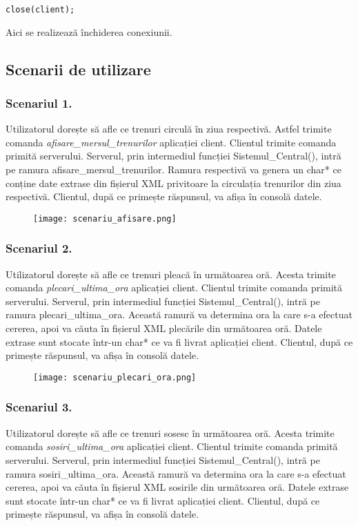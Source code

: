 \documentclass[runningheads]{llncs}
\begin{document}
\begin{verbatim}
close(client);
\end{verbatim}
Aici se realizează închiderea conexiunii.

\subsection{Scenarii de utilizare}

 \subsubsection{Scenariul 1.} 
 Utilizatorul dorește să afle ce trenuri circulă în ziua respectivă. Astfel trimite comanda \textit{afisare\_mersul\_trenurilor} aplicației client. Clientul trimite comanda primită serverului. Serverul, prin intermediul funcției Sistemul\_Central(), intră pe ramura afisare\_mersul\_trenurilor. Ramura respectivă va genera un char* ce conține date extrase din fișierul XML privitoare la circulația trenurilor din ziua respectivă. Clientul, după ce primește răspunsul, va afișa în consolă datele.
 \begin{figure}[H]
    \centering
    \texttt{[image: scenariu\_afisare.png]}
\end{figure}

 \subsubsection{Scenariul 2.} 
 Utilizatorul dorește să afle ce trenuri pleacă în următoarea oră. Acesta trimite comanda \textit{plecari\_ultima\_ora} aplicației client. Clientul trimite comanda primită serverului. Serverul, prin intermediul funcției Sistemul\_Central(), intră pe ramura plecari\_ultima\_ora.  Această ramură va determina ora la care s-a efectuat cererea, apoi va căuta în fișierul XML plecările din următoarea oră. Datele extrase sunt stocate într-un char* ce va fi livrat aplicației client. Clientul, după ce primește răspunsul, va afișa în consolă datele.

\begin{figure} [H]
    \centering
    \texttt{[image: scenariu\_plecari\_ora.png]}
\end{figure}
 \subsubsection{Scenariul 3.}
  Utilizatorul dorește să afle ce trenuri sosesc în următoarea oră. Acesta trimite comanda \textit{sosiri\_ultima\_ora} aplicației client. Clientul trimite comanda primită serverului. Serverul, prin intermediul funcției Sistemul\_Central(), intră pe ramura sosiri\_ultima\_ora.  Această ramură va determina ora la care s-a efectuat cererea, apoi va căuta în fișierul XML sosirile din următoarea oră. Datele extrase sunt stocate într-un char* ce va fi livrat aplicației client. Clientul, după ce primește răspunsul, va afișa în consolă datele.
\end{document}
